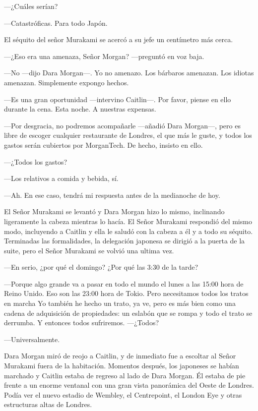 ---¿Cuáles serían?

---Catastróficas. Para todo Japón.

El séquito del señor Murakami se acercó a su jefe un centímetro más
cerca.

---¿Eso era una amenaza, Señor Morgan? ---preguntó en voz baja.

---No ---dijo Dara Morgan---. Yo no amenazo. Los bárbaros amenazan. Los
idiotas amenazan. Simplemente expongo hechos.

---Es una gran oportunidad ---intervino Caitlin---. Por favor, piense en
ello durante la cena. Esta noche. A nuestras expensas.

---Por desgracia, no podremos acompañarle ---añadió Dara Morgan---, pero
es libre de escoger cualquier restaurante de Londres, el que más le
guste, y todos los gastos serán cubiertos por MorganTech. De hecho,
insisto en ello.

---¿Todos los gastos?

---Los relativos a comida y bebida, sí.

---Ah. En ese caso, tendrá mi respuesta antes de la medianoche de hoy.

El Señor Murakami se levantó y Dara Morgan hizo lo mismo, inclinando
ligeramente la cabeza mientras lo hacía. El Señor Murakami respondió del
mismo modo, incluyendo a Caitlin y ella le saludó con la cabeza a él y a
todo su séquito. Terminadas las formalidades, la delegación japonesa se
dirigió a la puerta de la suite, pero el Señor Murakami se volvió una
ultima vez.

---En serio, ¿por qué el domingo? ¿Por qué las 3:30 de la tarde?

---Porque algo grande va a pasar en todo el mundo el lunes a las 15:00
hora de Reino Unido. Eso son las 23:00 hora de Tokio. Pero necesitamos
todos los tratos en marcha Yo también he hecho un trato, ya ve, pero es
más bien como una cadena de adquisición de propiedades: un eslabón que
se rompa y todo el trato se derrumba. Y entonces todos sufriremos.
---¿Todos?

---Universalmente.

Dara Morgan miró de reojo a Caitlin, y de inmediato fue a escoltar al
Señor Murakami fuera de la habitación. Momentos después, los japoneses
se habían marchado y Caitlin estaba de regreso al lado de Dara Morgan.
Él estaba de pie frente a un enorme ventanal con una gran vista
panorámica del Oeste de Londres. Podía ver el nuevo estadio de Wembley,
el Centrepoint, el London Eye y otras estructuras altas de Londres.

